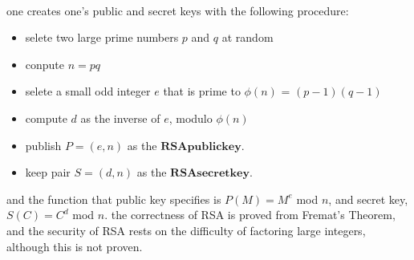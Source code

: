 \documentclass{article}
\begin{document}
  \paragraph{} one creates one's public and secret keys with the following procedure:
  \begin{itemize}
    \item selete two large prime numbers $p$ and $q$ at random
    \item conpute $n = pq$
    \item selete a small odd integer $e$ that is prime to $\phi(n)$ = $(p - 1)(q - 1)$
    \item compute $d$ as the inverse of $e$, modulo $\phi(n)$
    \item publish $P = (e, n)$ as the $\mathbf{RSA public key}$.
    \item keep pair $S = (d, n)$ as the $\mathbf{RSA secret key}$.
  \end{itemize}
  and the function that public key specifies is $P(M) = M^e$ mod $n$, and secret key, $S(C) = C^d$ mod $n$. the correctness of RSA is proved from Fremat's Theorem, and the security of RSA rests on the difficulty of factoring large integers, although this is not proven.
\end{document}
